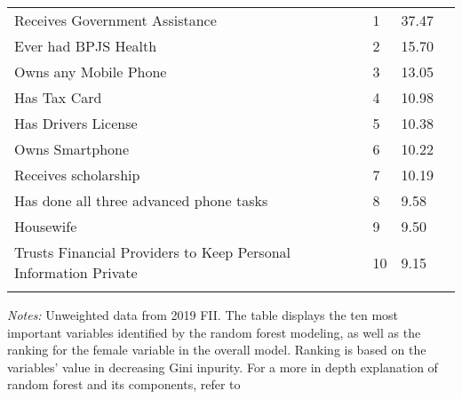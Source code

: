 \begin{table}[H]
\begin{adjustbox}{max width=1.3\textwidth}
\begin{threeparttable}
{\begin{tabular}{l*{1}{lll}}
Receives Government Assistance&        1&    37.47\\
Ever had BPJS Health&        2&    15.70\\
Owns any Mobile Phone&        3&    13.05\\
Has Tax Card    &        4&    10.98\\
Has Drivers License&        5&    10.38\\
Owns Smartphone &        6&    10.22\\
Receives scholarship&        7&    10.19\\
Has done all three advanced phone tasks&        8&     9.58\\
Housewife       &        9&     9.50\\
Trusts Financial Providers to Keep Personal Information Private&       10&     9.15\\
 \bottomrule \addlinespace[1.5ex] \end{tabular}} \begin{tablenotes}[flushleft]  \small \item \emph{Notes:} Unweighted data from 2019 FII. The table displays the ten most important variables identified by the random forest modeling, as well as the ranking for the female variable in the overall model. Ranking is based on the variables' value in decreasing Gini inpurity. For a more in depth explanation of random forest and its components, refer to \cite{rfart} \end{tablenotes} \end{threeparttable} \end{adjustbox} \end{table} \vspace*{-5mm}
